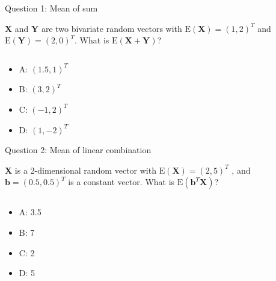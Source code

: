 \documentclass[ignorenonframetext,]{beamer}
\providecommand{\tightlist}{%
  \setlength{\itemsep}{0pt}\setlength{\parskip}{0pt}}
\begin{document}
\begin{frame}

\begin{block}{Question 1: Mean of sum}

\vspace{2mm}

\(\boldsymbol{X}\) and \(\boldsymbol{Y}\) are two bivariate random
vectors with \(\text{E}(\boldsymbol{X})=(1,2)^T\) and
\(\text{E}(\boldsymbol{Y})=(2,0)^T\). What is
\(\text{E}(\boldsymbol{X}+\boldsymbol{Y})\)?

\(~\)

\begin{itemize}
\tightlist
\item
  A: \((1.5,1)^T\)
\item
  B: \((3,2)^T\)
\item
  C: \((-1,2)^ T\)
\item
  D: \((1,-2)^T\)
\end{itemize}

\end{block}

\end{frame}

\begin{frame}

\begin{block}{Question 2: Mean of linear combination}

\vspace{2mm}

\(\boldsymbol{X}\) is a 2-dimensional random vector with
\(\text{E}(\boldsymbol{X})=(2,5)^T\) , and
\(\boldsymbol{b}=(0.5, 0.5)^T\) is a constant vector. What is
\(\text{E}(\boldsymbol{b}^T\boldsymbol{X})\)?

\(~\)

\begin{itemize}
\tightlist
\item
  A: 3.5
\item
  B: 7
\item
  C: 2
\item
  D: 5
\end{itemize}

\end{block}

\end{frame}
\end{document}
